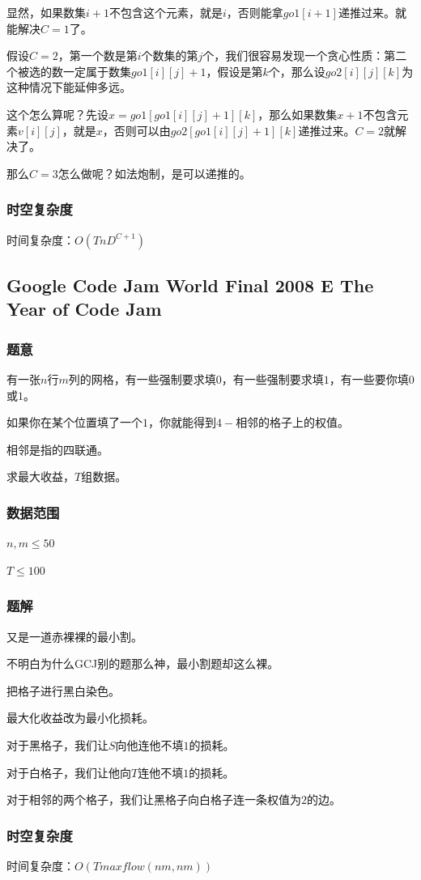 \documentclass{ctexart}
\begin{document}
显然，如果数集$i+1$不包含这个元素，就是$i$，否则能拿$go1[i+1]$递推过来。就能解决$C=1$了。

假设$C=2$，第一个数是第$i$个数集的第$j$个，我们很容易发现一个贪心性质：第二个被选的数一定属于数集$go1[i][j]+1$，假设是第$k$个，那么设$go2[i][j][k]$为这种情况下能延伸多远。

这个怎么算呢？先设$x=go1[go1[i][j]+1][k]$，那么如果数集$x+1$不包含元素$v[i][j]$，就是$x$，否则可以由$go2[go1[i][j]+1][k]$递推过来。$C=2$就解决了。

那么$C=3$怎么做呢？如法炮制，是可以递推的。
\subsubsection{时空复杂度}
时间复杂度：$O(TnD^{C+1})$
\subsection{Google Code Jam World Final 2008 E The Year of Code Jam}
\subsubsection{题意}
有一张$n$行$m$列的网格，有一些强制要求填$0$，有一些强制要求填$1$，有一些要你填$0$或$1$。

如果你在某个位置填了一个$1$，你就能得到$4-$相邻的格子上的权值。

相邻是指的四联通。

求最大收益，$T$组数据。
\subsubsection{数据范围}
$n,m \le 50$

$T \le 100$
\subsubsection{题解}
又是一道赤裸裸的最小割。

不明白为什么GCJ别的题那么神，最小割题却这么裸。

把格子进行黑白染色。

最大化收益改为最小化损耗。

对于黑格子，我们让$S$向他连他不填$1$的损耗。

对于白格子，我们让他向$T$连他不填$1$的损耗。

对于相邻的两个格子，我们让黑格子向白格子连一条权值为$2$的边。
\subsubsection{时空复杂度}
时间复杂度：$O(Tmaxflow(nm,nm))$
\end{document}
